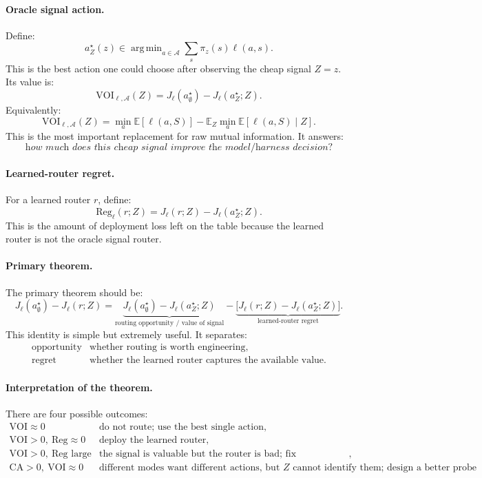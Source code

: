 \documentclass{article}
\DeclareMathOperator*{\argmin}{arg\,min}
\begin{document}
\paragraph{Oracle signal action.}
Define:
\[
    a^\star_Z(z)
    \in
    \argmin_{a\in\mathcal A}
    \sum_s \pi_z(s)\ell(a,s).
\]
This is the best action one could choose after observing the cheap signal \(Z=z\).
Its value is:
\[
    \mathrm{VOI}_{\ell,\mathcal A}(Z)
    =
    J_\ell(a^\star_{\emptyset})
    -
    J_\ell(a^\star_Z;Z).
\]
Equivalently:
\[
    \mathrm{VOI}_{\ell,\mathcal A}(Z)
    =
    \min_a \mathbb E[\ell(a,S)]
    -
    \mathbb E_Z
    \min_a \mathbb E[\ell(a,S)\mid Z].
\]
This is the most important replacement for raw mutual information.
It answers:
\[
    \textit{how much does this cheap signal improve the model/harness decision?}
\]

\paragraph{Learned-router regret.}
For a learned router \(r\), define:
\[
    \mathrm{Reg}_{\ell}(r;Z)
    =
    J_\ell(r;Z)-J_\ell(a^\star_Z;Z).
\]
This is the amount of deployment loss left on the table because the learned router is not
the oracle signal router.

\paragraph{Primary theorem.}
The primary theorem should be:
\[
\boxed{
    J_\ell(a^\star_{\emptyset}) - J_\ell(r;Z)
    =
    \underbrace{
    J_\ell(a^\star_{\emptyset})-J_\ell(a^\star_Z;Z)
    }_{\text{routing opportunity / value of signal}}
    -
    \underbrace{
    \bigl[
    J_\ell(r;Z)-J_\ell(a^\star_Z;Z)
    \bigr]
    }_{\text{learned-router regret}}.
}
\]
This identity is simple but extremely useful.
It separates:
\[
\begin{array}{ll}
    \text{opportunity} & \text{whether routing is worth engineering},\\
    \text{regret} & \text{whether the learned router captures the available value}.
\end{array}
\]

\paragraph{Interpretation of the theorem.}
There are four possible outcomes:
\[
\begin{array}{ll}
    \mathrm{VOI}\approx 0 &
    \text{do not route; use the best single action},\\
    \mathrm{VOI}>0,\ \mathrm{Reg}\approx 0 &
    \text{deploy the learned router},\\
    \mathrm{VOI}>0,\ \mathrm{Reg}\text{ large} &
    \text{the signal is valuable but the router is bad; fix calibration/decision rule},\\
    \mathrm{CA}>0,\ \mathrm{VOI}\approx 0 &
    \text{different modes want different actions, but \(Z\) cannot identify them;
    design a better probe}.
\end{array}
\]
\end{document}
